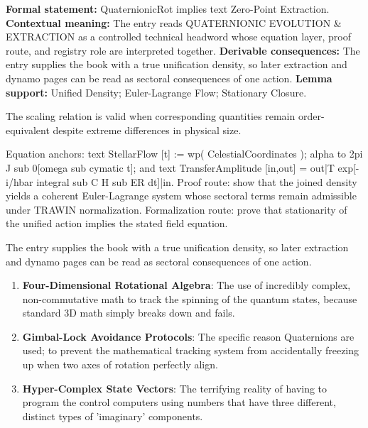 \begingroup\footnotesize\setlength{\emergencystretch}{3em}\sloppy
\textbf{Formal statement:} QuaternionicRot implies text Zero-Point Extraction. \textbf{Contextual meaning:} The entry reads QUATERNIONIC EVOLUTION \& EXTRACTION as a controlled technical headword whose equation layer, proof route, and registry role are interpreted together. \textbf{Derivable consequences:} The entry supplies the book with a true unification density, so later extraction and dynamo pages can be read as sectoral consequences of one action. \textbf{Lemma support:} Unified Density; Euler-Lagrange Flow; Stationary Closure.\par
\endgroup

The scaling relation is valid when corresponding quantities remain order-equivalent despite extreme differences in physical size.

Equation anchors: text StellarFlow [t] := wp( CelestialCoordinates ); alpha to 2pi J sub 0[omega sub cymatic t]; and text TransferAmplitude [in,out] = out|T exp[-i/hbar integral sub C H sub ER dt]|in. Proof route: show that the joined density yields a coherent Euler-Lagrange system whose sectoral terms remain admissible under TRAWIN normalization. Formalization route: prove that stationarity of the unified action implies the stated field equation.

The entry supplies the book with a true unification density, so later extraction and dynamo pages can be read as sectoral consequences of one action.
\endgroup

\begin{enumerate}[leftmargin=1.6em,itemsep=6pt,topsep=4pt]
\item \textbf{Four-Dimensional Rotational Algebra}: The use of incredibly complex, non-commutative math to track the spinning of the quantum states, because standard 3D math simply breaks down and fails.
\item \textbf{Gimbal-Lock Avoidance Protocols}: The specific reason Quaternions are used; to prevent the mathematical tracking system from accidentally freezing up when two axes of rotation perfectly align.
\item \textbf{Hyper-Complex State Vectors}: The terrifying reality of having to program the control computers using numbers that have three different, distinct types of 'imaginary' components.
\end{enumerate}

